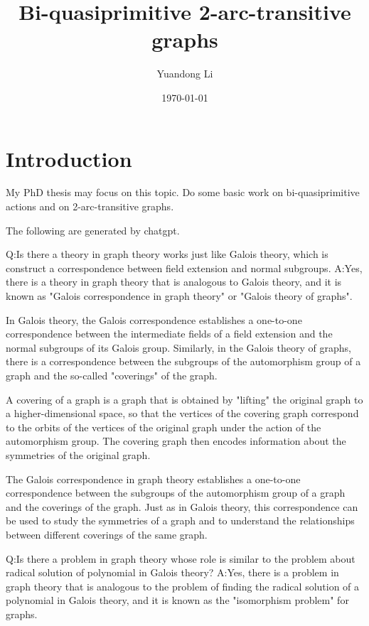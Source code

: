\documentclass[a4,11pt]{article}
\title{Bi-quasiprimitive 2-arc-transitive graphs}
\author{Yuandong Li}
\date{\today}
\begin{document}
\maketitle

\tableofcontents

\section{Introduction}
My PhD thesis may focus on this topic. 
Do some basic work on bi-quasiprimitive actions and on 2-arc-transitive graphs.

The following are generated by chatgpt.

Q:Is there a theory in graph theory works just like Galois theory, which is construct a correspondence between field extension and normal subgroups.
A:Yes, there is a theory in graph theory that is analogous to Galois theory, and it is known as "Galois correspondence in graph theory" or "Galois theory of graphs".

In Galois theory, the Galois correspondence establishes a one-to-one correspondence between the intermediate fields of a field extension and the normal subgroups of its Galois group. Similarly, in the Galois theory of graphs, there is a correspondence between the subgroups of the automorphism group of a graph and the so-called "coverings" of the graph.

A covering of a graph is a graph that is obtained by "lifting" the original graph to a higher-dimensional space, so that the vertices of the covering graph correspond to the orbits of the vertices of the original graph under the action of the automorphism group. The covering graph then encodes information about the symmetries of the original graph.

The Galois correspondence in graph theory establishes a one-to-one correspondence between the subgroups of the automorphism group of a graph and the coverings of the graph. Just as in Galois theory, this correspondence can be used to study the symmetries of a graph and to understand the relationships between different coverings of the same graph.



Q:Is there a problem in graph theory whose role is similar to the problem about radical solution of polynomial in Galois theory?
A:Yes, there is a problem in graph theory that is analogous to the problem of finding the radical solution of a polynomial in Galois theory, and it is known as the "isomorphism problem" for graphs.
\end{document}
